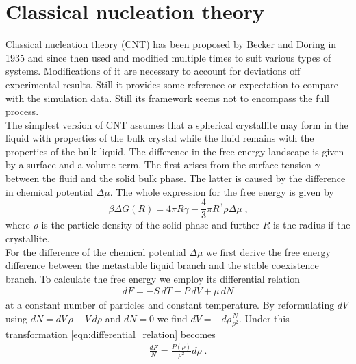 
\section{Classical nucleation theory }
\label{sec:CNT}
Classical nucleation theory (CNT) has been proposed by Becker and Döring in 1935\cite{Becker1935} and since then used and modified multiple times to suit various types of systems. Modifications of it are necessary to account for deviations off experimental results. Still it provides some reference or expectation to compare with the simulation data. Still its framework seems not to encompass the full process.\\

The simplest version of CNT assumes that a spherical crystallite may form in the liquid with properties of the bulk crystal while the fluid remains with the properties of the bulk liquid. The difference in the free energy landscape is given by a surface and a volume term. The first arises from the surface tension $\gamma$ between the fluid and the solid bulk phase. The latter is caused by the difference in chemical potential $\Delta \mu$. The whole expression for the free energy is given by
\begin{equation}
\label{eqn:free_energy}
\beta \Delta G(R) =4 \pi R \gamma -\frac{4}{3} \pi R^3 \rho \Delta \mu  \; \text{,}
\end{equation}
where $\rho$ is the particle density of the solid phase and further $R$ is the radius if the crystallite.\\

For the difference of the chemical potential $\Delta \mu $ we first derive the free energy difference between the metastable liquid branch and the stable coexistence branch. To calculate the free energy we employ its differential relation
\begin{align}
\label{eqn:differential_relation}
dF = -S  \, dT -P \, dV + \mu  \, dN
\end{align}
at a constant number of particles and constant temperature. By reformulating $dV$ using $ dN = dV  \, \rho + V  \, d\rho  $ and $dN = 0 $ we find  $ dV = -d\rho \frac{N}{\rho^2}$. Under this transformation \autoref{eqn:differential_relation} becomes
\begin{align}
\label{eqn:df_relation}
\frac{dF}{N} = \frac{P(\rho)}{\rho^2} d\rho \; \text{.}
\end{align}

